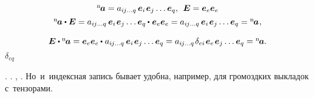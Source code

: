 \nopagebreak\vspace{-0.1em}\[\begin{array}{c}
{^\mathrm{n}\hspace{-0.2ex}\bm{a}} = a_{i\hspace{-0.1ex}j \ldots q} \hspace{.4ex} \bm{e}_i \hspace{.2ex} \bm{e}_j \ldots \bm{e}_q , \;\,  \bm{E} = \bm{e}_e \bm{e}_e
\\[.4em]
%
{^\mathrm{n}\hspace{-0.2ex}\bm{a}} \dotp \bm{E} = a_{i\hspace{-0.1ex}j \ldots q} \hspace{.4ex} \bm{e}_i \hspace{.2ex} \bm{e}_j \ldots \tikzmark{BeginDeltaEQBrace} {\bm{e}_q \hspace{-0.1ex} \dotp \hspace{.1ex} \bm{e}_e} \tikzmark{EndDeltaEQBrace} \bm{e}_e = a_{i\hspace{-0.1ex}j \ldots q} \hspace{.4ex} \bm{e}_i \hspace{.2ex} \bm{e}_j \ldots \bm{e}_q = {^\mathrm{n}\hspace{-0.2ex}\bm{a}} \hspace{.1ex},
\\[1.1em]
%
\bm{E} \dotp {^\mathrm{n}\hspace{-0.2ex}\bm{a}} = \bm{e}_e \bm{e}_e \hspace{-0.1ex} \dotp \hspace{.1ex}  a_{i\hspace{-0.1ex}j \ldots q} \hspace{.4ex} \bm{e}_i \hspace{.2ex} \bm{e}_j \ldots \bm{e}_q = a_{i\hspace{-0.1ex}j \ldots q} \hspace{.2ex} \delta_{ei} \hspace{.2ex} \bm{e}_e \hspace{.2ex} \bm{e}_j \ldots \bm{e}_q = {^\mathrm{n}\hspace{-0.2ex}\bm{a}}.
\end{array}\]
%
{${\scriptstyle \delta_{eq}}$}

\vspace{-0.5em}
   .
  .
 ,    .
\foreignlanguage{russian}{Но~и~индексная запись бывает удобна, например, для громоздких выкладок с~тензорами.}


